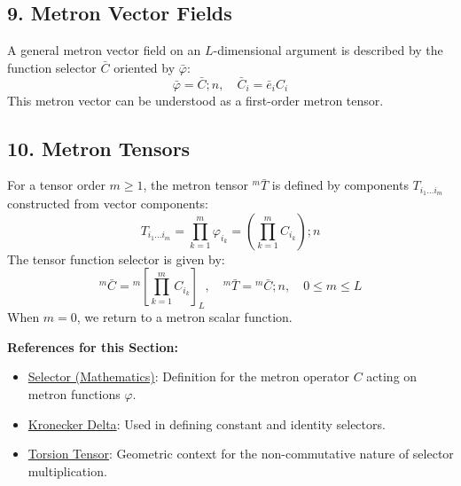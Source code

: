 \documentclass[11pt,a4paper,oneside]{article}
\newenvironment{sectionrefs}
  {\par\vspace{1em}\noindent\textbf{\textsf{References for this Section:}}\begin{itemize}[leftmargin=*, label={\scriptsize$\blacksquare$}, itemsep=2pt]}
  {\end{itemize}}
\begin{document}
\subsection{9. Metron Vector Fields}
A general metron vector field on an $L$-dimensional argument is described by the function selector $\bar{C}$ oriented by $\bar{\varphi}$:
\begin{equation*}
    \bar{\varphi} = \bar{C}; n, \quad \bar{C}_i = \bar{e}_i C_i
\end{equation*}
This metron vector can be understood as a first-order metron tensor.

\subsection{10. Metron Tensors}
For a tensor order $m \ge 1$, the metron tensor ${}^m \bar{T}$ is defined by components $T_{i_1 \dots i_m}$ constructed from vector components:
\begin{equation}
    T_{i_1 \dots i_m} = \prod_{k=1}^m \varphi_{i_k} = \left( \prod_{k=1}^m C_{i_k} \right); n \tag{M11c}
\end{equation}
The tensor function selector is given by:
\begin{equation*}
    {}^m \bar{C} = {}^m [ \prod_{k=1}^m C_{i_k} ]_L, \quad {}^m \bar{T} = {}^m \bar{C}; n, \quad 0 \le m \le L
\end{equation*}
When $m=0$, we return to a metron scalar function.

\begin{center}
\end{center}

\begin{sectionrefs}
    \item \href{https://en.wikipedia.org/wiki/Selector}{Selector (Mathematics)}: Definition for the metron operator $C$ acting on metron functions $\varphi$.
    \item \href{https://en.wikipedia.org/wiki/Kronecker_delta}{Kronecker Delta}: Used in defining constant and identity selectors.
    \item \href{https://en.wikipedia.org/wiki/Torsion_tensor}{Torsion Tensor}: Geometric context for the non-commutative nature of selector multiplication.
\end{sectionrefs}
\end{document}
